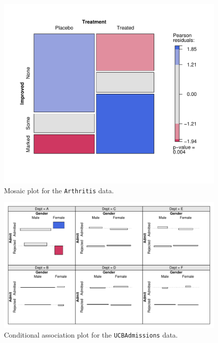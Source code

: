 \documentclass{Z}
\newcommand{\data}[1]{\texttt{#1}}
\begin{document}
\begin{figure}[p]
\begin{center}
\includegraphics{strucplot-Arthritis}
\caption{Mosaic plot for the \data{Arthritis} data.}
\label{fig:arthritis}
\end{center}
\end{figure}

\begin{figure}[p]
\begin{center}
\includegraphics{strucplot-UCBAdmissions}
\caption{Conditional association plot for the \data{UCBAdmissions} data.}
\label{fig:ucbadmissions}
\end{center}
\end{figure}
\end{document}

